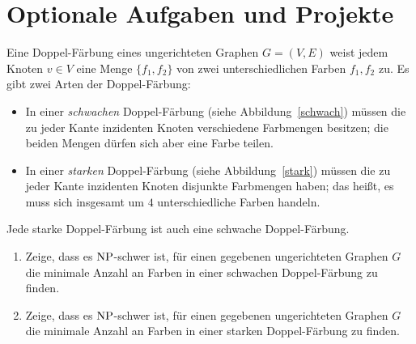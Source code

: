\documentclass{uebung_cs}
\begin{document}
\section*{Optionale Aufgaben und Projekte}

\begin{exercise}[Doppel-Färbung][\projekt]
    Eine Doppel-Färbung eines ungerichteten Graphen $G = (V,E)$ weist jedem Knoten $v \in V$ eine Menge $\{f_1,f_2\}$ von zwei unterschiedlichen Farben $f_1,f_2$ zu. Es gibt zwei Arten der Doppel-Färbung:
    \begin{itemize}
        \item In einer \textit{schwachen} Doppel-Färbung (siehe Abbildung~\ref{schwach}) müssen die zu jeder Kante inzidenten Knoten verschiedene Farbmengen besitzen; die beiden Mengen dürfen sich aber eine Farbe teilen.
        \item In einer \textit{starken} Doppel-Färbung (siehe Abbildung~\ref{stark}) müssen die zu jeder Kante inzidenten Knoten disjunkte Farbmengen haben; das heißt, es muss sich insgesamt um $4$ unterschiedliche Farben handeln.
    \end{itemize}
    Jede starke Doppel-Färbung ist auch eine schwache Doppel-Färbung.
    \begin{enumerate}
        \item\medium Zeige, dass es $\mathrm{NP}$-schwer ist, für einen gegebenen ungerichteten Graphen $G$ die minimale Anzahl an Farben in einer schwachen Doppel-Färbung zu finden.
        \item\hard Zeige, dass es $\mathrm{NP}$-schwer ist, für einen gegebenen ungerichteten Graphen $G$ die minimale Anzahl an Farben in einer starken Doppel-Färbung zu finden.
    \end{enumerate}
    \begin{figure}[ht]
        \begin{minipage}{0.5\linewidth}
            \centering
\end{minipage}
\end{figure}
\end{exercise}
\end{document}
